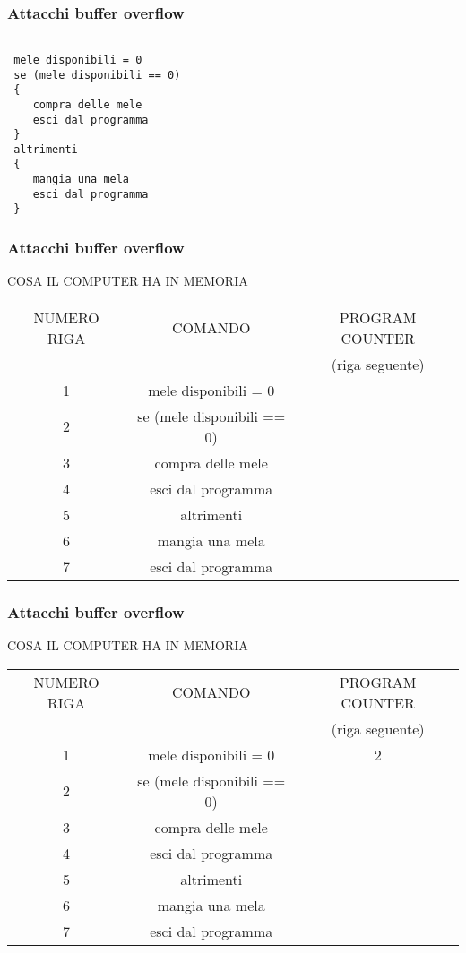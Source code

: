 \documentclass[italian,aspectratio=169]{beamer}
\begin{document}
\begin{frame}[fragile]
 \frametitle{Attacchi buffer overflow}
\begin{verbatim}

 mele disponibili = 0
 se (mele disponibili == 0)
 {
    compra delle mele
    esci dal programma
 }
 altrimenti
 {
    mangia una mela
    esci dal programma
 }
\end{verbatim}
\end{frame}

\begin{frame}
 \frametitle{Attacchi buffer overflow}
 COSA IL COMPUTER HA IN MEMORIA
 \begin{center}
 \begin{tabular}{|c|c|c|}
\hline 
{NUMERO RIGA} & {COMANDO} & {PROGRAM COUNTER}\tabularnewline
{}&{}&{(riga seguente)}\tabularnewline
\hline 
\hline 
{1} & {mele disponibili = 0} & {}\tabularnewline
\hline
{2} & {se (mele disponibili == 0)} & {}\tabularnewline
\hline
{3} & {compra delle mele} & {}\tabularnewline
\hline
{4} & {esci dal programma} & {}\tabularnewline
\hline
{5} & {altrimenti} & {}\tabularnewline
\hline
{6} & {mangia una mela} & {}\tabularnewline
\hline
{7} & {esci dal programma} & {}\tabularnewline
\hline 
\end{tabular}
\end{center}
\end{frame}

\begin{frame}
 \frametitle{Attacchi buffer overflow}
 COSA IL COMPUTER HA IN MEMORIA
 \begin{center}
 \begin{tabular}{|c|c|c|}
\hline 
{NUMERO RIGA} & {COMANDO} & {PROGRAM COUNTER}\tabularnewline
{}&{}&{(riga seguente)}\tabularnewline
\hline 
\hline 
{1} & {mele disponibili = 0} & {2}\tabularnewline
\hline
{2} & {se (mele disponibili == 0)} & {}\tabularnewline
\hline
{3} & {compra delle mele} & {}\tabularnewline
\hline
{4} & {esci dal programma} & {}\tabularnewline
\hline
{5} & {altrimenti} & {}\tabularnewline
\hline
{6} & {mangia una mela} & {}\tabularnewline
\hline
{7} & {esci dal programma} & {}\tabularnewline
\hline 
\end{tabular}
\end{center}
\end{frame}
\end{document}
